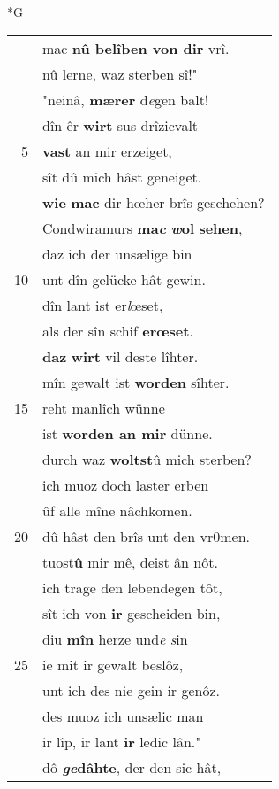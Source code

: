 \documentclass[8pt,a4paper,notitlepage]{article}
\begin{document}
\begin{table}[ht]
\begin{minipage}[t]{0.5\linewidth}
\small
\begin{center}*G
\end{center}
\begin{tabular}{rl}
 & mac \textbf{nû belîben von dir} vrî.\\ 
 & nû lerne, waz sterben sî!"\\ 
 & "neinâ, \textbf{mærer} d\textit{e}gen balt!\\ 
 & dîn êr \textbf{wirt} sus drîzicvalt\\ 
5 & \textbf{vast} an mir erzeiget,\\ 
 & sît dû mich hâst geneiget.\\ 
 & \textbf{wie} \textbf{mac} dir hœher brîs geschehen?\\ 
 & Condwiramurs \textbf{ma\textit{c}} \textbf{\textit{w}ol} \textbf{sehen},\\ 
 & daz ich der unsælige bin\\ 
10 & unt dîn gelücke hât gewin.\\ 
 & dîn lant ist er\textit{l}œset,\\ 
 & als der sîn schif \textbf{erœset}.\\ 
 & \textbf{daz} \textbf{wirt} vil deste lîhter.\\ 
 & mîn gewalt ist \textbf{worden} sîhter.\\ 
15 & reht manlîch wünne\\ 
 & ist \textbf{worden an mir} dünne.\\ 
 & durch waz \textbf{woltst}û mich sterben?\\ 
 & ich muoz doch laster erben\\ 
 & ûf alle mîne nâchkomen.\\ 
20 & dû hâst den brîs unt den vr0men.\\ 
 & tuost\textbf{û} mir mê, deist ân nôt.\\ 
 & ich trage den lebendegen tôt,\\ 
 & sît ich von \textbf{ir} gescheiden bin,\\ 
 & diu \textbf{mîn} herze und\textit{e} \textit{s}in\\ 
25 & ie mit ir gewalt beslôz,\\ 
 & unt ich des nie gein ir genôz.\\ 
 & des muoz ich unsælic man\\ 
 & ir lîp, ir lant \textbf{ir} ledic lân."\\ 
 & dô \textbf{\textit{ge}dâhte}, der den sic hât,\\ 

\end{tabular}
\end{minipage}
\end{table}
\end{document}
